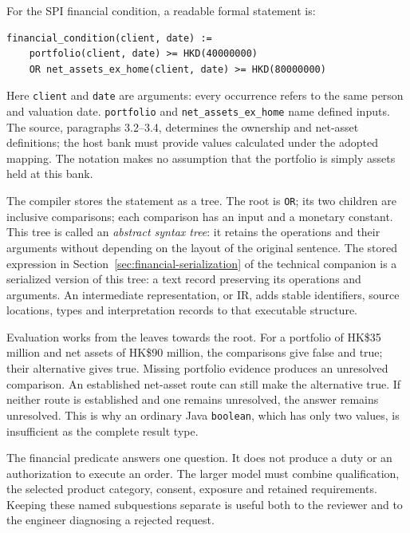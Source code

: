 For the SPI financial condition, a readable formal statement is:
\begin{lstlisting}[caption={Illustrative controlled syntax for Annex 1 paragraph 3.1. This is a teaching notation, not Catala or Stipula source.}]
financial_condition(client, date) :=
    portfolio(client, date) >= HKD(40000000)
    OR net_assets_ex_home(client, date) >= HKD(80000000)
\end{lstlisting}
Here \texttt{client} and \texttt{date} are arguments: every occurrence refers to
the same person and valuation date. \texttt{portfolio} and
\texttt{net\_assets\_ex\_home} name defined inputs. The source, paragraphs
3.2--3.4, determines the ownership and net-asset definitions; the host bank must
provide values calculated under the adopted mapping. The notation makes no
assumption that the portfolio is simply assets held at this bank.


The compiler stores the statement as a tree. The root is \texttt{OR}; its two
children are inclusive comparisons; each comparison has an input and a monetary
constant. This tree is called an \emph{abstract syntax tree}: it retains the
operations and their arguments without depending on the layout of the original
sentence. The stored expression in Section~\ref{sec:financial-serialization} of the technical companion is a serialized
version of this tree: a text record preserving its operations and arguments. An intermediate representation, or IR, adds stable identifiers, source
locations, types and interpretation records to that executable structure.

Evaluation works from the leaves towards the root. For a portfolio of HK\$35
million and net assets of HK\$90 million, the comparisons give false and true;
their alternative gives true. Missing portfolio evidence produces an unresolved
comparison. An established net-asset route can still make the alternative true.
If neither route is established and one remains unresolved, the answer remains
unresolved. This is why an ordinary Java \texttt{boolean}, which has only two
values, is insufficient as the complete result type.

The financial predicate answers one question. It does not produce a duty or an
authorization to execute an order. The larger model must combine qualification,
the selected product category, consent, exposure and retained requirements.
Keeping these named subquestions separate is useful both to the reviewer and
to the engineer diagnosing a rejected request.


